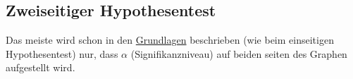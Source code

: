 \subsection{Zweiseitiger Hypothesentest}

Das meiste wird schon in den 
\hyperref[sec:hypothesengrundlagen]{Grundlagen}
beschrieben (wie beim einseitigen Hypothesentest) nur, dass $\alpha$
(Signifikanzniveau) auf beiden seiten des Graphen aufgestellt wird.


